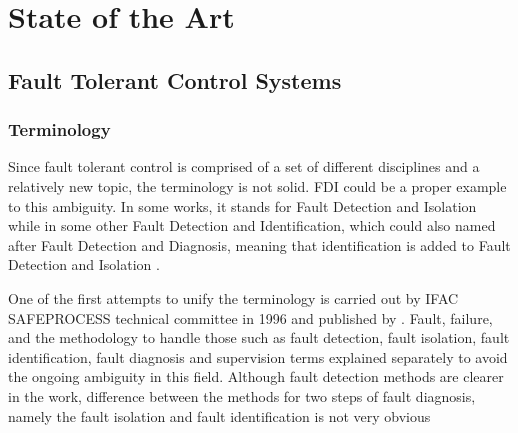 
{}

\chapter{State of the Art}

\section{Fault Tolerant Control Systems}

\subsection{Terminology}\label{ch2:terminology}

Since fault tolerant control is comprised of a set of different disciplines and a relatively 
new topic, the terminology is not solid. FDI could be a proper example to this ambiguity. 
In some works, it stands for Fault Detection and Isolation while in some other 
Fault Detection and Identification, which could also named after Fault Detection and Diagnosis, 
meaning that identification is added to Fault Detection and Isolation \cite{zhang2008bibliographical}.

One of the first attempts to unify the terminology is carried out by IFAC SAFEPROCESS 
technical committee in 1996 and published by \cite{isermann1997trends}. Fault, failure, 
and the methodology to handle those such as fault detection, fault isolation, fault identification, 
fault diagnosis and supervision terms explained separately to avoid the ongoing ambiguity 
in this field. Although fault detection methods are clearer in the work, difference between 
the methods for two steps of fault diagnosis, namely the fault isolation and fault 
identification is not very obvious

